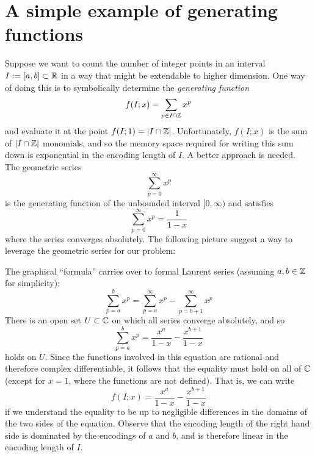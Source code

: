 \section{A simple example of generating functions}
\label{sec:simple-example-generating-functions}

Suppose we want to count the number of integer points in an interval $I := [a,b] \subset \mathbb{R}$
in a way that might be extendable to higher dimension.
One way of doing this is to symbolically determine the \emph{generating function}
\[
  f(I;x) = \sum_{p \in I \cap \mathbb{Z}} x^p
\]
and evaluate it at the point $f(I;1) = |I \cap \mathbb{Z}|$.
Unfortunately, $f(I;x)$ is the sum of $|I \cap \mathbb{Z}|$ monomials,
and so the memory space required for writing this sum down is exponential in the encoding length of $I$.
A better approach is needed. The geometric series
\[
  \sum_{p = 0}^\infty x^p
\]
is the generating function of the unbounded interval $[0,\infty)$
and satisfies
\[
  \sum_{p = 0}^\infty x^p = \frac{1}{1 - x}
\]
where the series converges absolutely.
The following picture suggest a way to leverage the geometric series for our problem:
\begin{center}
\end{center}
The graphical ``formula'' carries over to formal Laurent series (assuming $a, b \in \mathbb{Z}$ for simplicity):
\[
  \sum_{p = a}^b x^p = \sum_{p = a}^\infty x^p - \sum_{p = b+1}^\infty x^p
\]
There is an open set $U \subset \mathbb{C}$ on which all series converge absolutely,
and so
\[
  \sum_{p = a}^b x^p = \frac{x^a}{1 - x} - \frac{x^{b + 1}}{1 - x}
\]
holds on $U$.
Since the functions involved in this equation are rational and therefore complex differentiable,
it follows that the equality must hold on all of $\mathbb{C}$ (except for $x = 1$, where the functions are not defined).
That is, we can write
\[
  f(I;x) = \frac{x^a}{1 - x} - \frac{x^{b + 1}}{1 - x}
\]
if we understand the equality to be up to negligible differences in the domains of the two sides of the equation.
Observe that the encoding length of the right hand side is dominated by the encodings of $a$ and $b$,
and is therefore linear in the encoding length of $I$.

